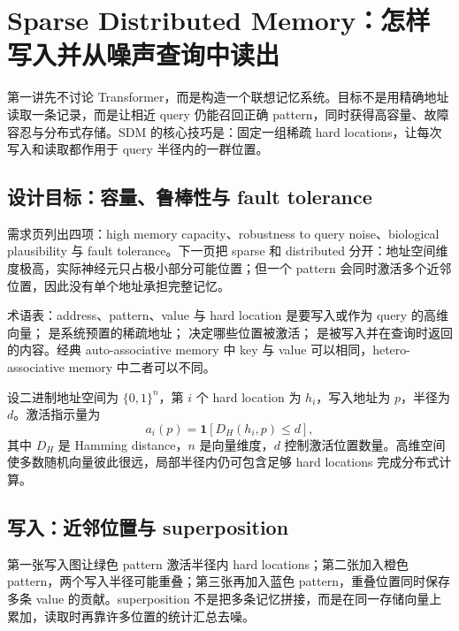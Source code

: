 \section{Sparse Distributed Memory：怎样写入并从噪声查询中读出}

第一讲先不讨论 Transformer，而是构造一个联想记忆系统。目标不是用精确地址读取一条记录，而是让相近 query 仍能召回正确 pattern，同时获得高容量、故障容忍与分布式存储。SDM 的核心技巧是：固定一组稀疏 hard locations，让每次写入和读取都作用于 query 半径内的一群位置。

\subsection{设计目标：容量、鲁棒性与 fault tolerance}

需求页列出四项：high memory capacity、robustness to query noise、biological plausibility 与 fault tolerance。下一页把 sparse 和 distributed 分开：地址空间维度极高，实际神经元只占极小部分可能位置；但一个 pattern 会同时激活多个近邻位置，因此没有单个地址承担完整记忆。



\begin{knowledgebox}{术语表：address、pattern、value 与 hard location}
 是要写入或作为 query 的高维向量； 是系统预置的稀疏地址； 决定哪些位置被激活； 是被写入并在查询时返回的内容。经典 auto-associative memory 中 key 与 value 可以相同，hetero-associative memory 中二者可以不同。
\end{knowledgebox}

设二进制地址空间为 $\{0,1\}^{n}$，第 $i$ 个 hard location 为 $h_i$，写入地址为 $p$，半径为 $d$。激活指示量为
$$
a_i(p)=\mathbf{1}\!\left[D_H(h_i,p)\le d\right],
$$
其中 $D_H$ 是 Hamming distance，$n$ 是向量维度，$d$ 控制激活位置数量。高维空间使多数随机向量彼此很远，局部半径内仍可包含足够 hard locations 完成分布式计算。

\subsection{写入：近邻位置与 superposition}

第一张写入图让绿色 pattern 激活半径内 hard locations；第二张加入橙色 pattern，两个写入半径可能重叠；第三张再加入蓝色 pattern，重叠位置同时保存多条 value 的贡献。superposition 不是把多条记忆拼接，而是在同一存储向量上累加，读取时再靠许多位置的统计汇总去噪。

